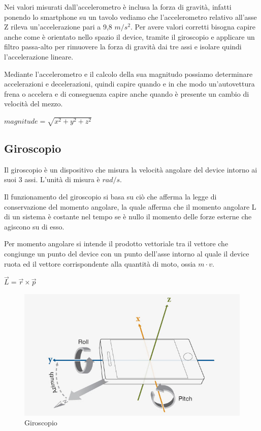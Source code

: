 \documentclass[12pt,a4paper,openright,twoside]{report}
\begin{document}
Nei valori misurati dall'accelerometro è inclusa la forza di gravità, infatti ponendo lo smartphone su un tavolo vediamo che l'accelerometro relativo all'asse Z rileva un'accelerazione pari a 9,8 $m/s^2$.
Per avere valori corretti bisogna capire anche come è orientato nello spazio il device, tramite il giroscopio e applicare un filtro passa-alto per rimuovere la forza di gravità dai tre assi e isolare quindi l'accelerazione lineare.

Mediante l'accelerometro e il calcolo della sua magnitudo possiamo determinare accelerazioni e decelerazioni, quindi capire quando e in che modo un'autovettura frena o accelera e di conseguenza capire anche quando è presente un cambio di velocità del mezzo. \cite{K1, K2, K3, K4, K5, K6}

\begin{center}
$ magnitude = \sqrt{ x^2 + y^2 + z^2}$
\end{center}

\subsection{Giroscopio}
Il giroscopio è un dispositivo che misura la velocità angolare del device intorno ai suoi 3 assi. L'unità di misura è $rad/s$. 

Il funzionamento del giroscopio si basa su ciò che afferma la legge di conservazione del momento angolare, la quale afferma che il momento angolare L di un sistema è costante nel tempo se è nullo il momento delle forze esterne che agiscono su di esso.

Per momento angolare si intende il prodotto vettoriale tra il vettore che congiunge un punto del device con un punto dell'asse intorno al quale il device ruota ed il vettore corrispondente alla quantità di moto, ossia $m \cdot v$.
\begin{center}
$\overrightarrow{L} =  \overrightarrow{r} \times \overrightarrow{p}$
\end{center}

\begin{figure}[h!]
\centering 
\includegraphics[scale=0.6]{fig6} 
\caption{Giroscopio} 
\end{figure}
\end{document}
